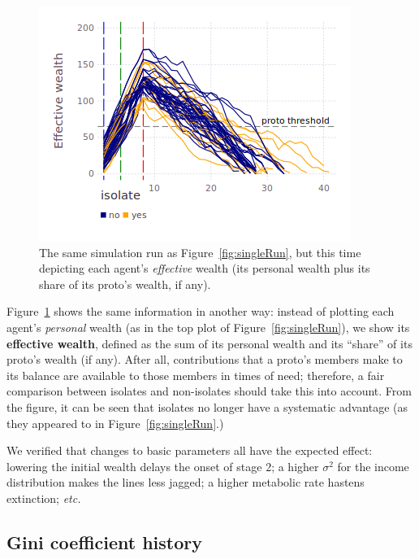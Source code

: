 \begin{figure}[ht]
\centering
\includegraphics[width=\columnwidth]{figures/sampleEffectiveHistory.png}
\caption{The same simulation run as Figure~\ref{fig:singleRun}, but this time
depicting each agent's \textit{effective} wealth (its personal wealth plus its
share of its proto's wealth, if any).}
\label{fig:effectiveWealthSingleRun}
\end{figure}

Figure~\ref{fig:effectiveWealthSingleRun} shows the same information in another
way: instead of plotting each agent's \textit{personal} wealth (as in the top
plot of Figure~\ref{fig:singleRun}), we show its \textbf{effective wealth},
defined as the sum of its personal wealth and its ``share'' of its proto's
wealth (if any). After all, contributions that a proto's members make to its
balance are available to those members in times of need; therefore, a fair
comparison between isolates and non-isolates should take this into account.
From the figure, it can be seen that isolates no longer have a systematic
advantage (as they appeared to in Figure~\ref{fig:singleRun}.)

We verified that changes to basic parameters all have the expected effect:
lowering the initial wealth delays the onset of stage 2; a higher $\sigma^2$
for the income distribution makes the lines less jagged; a higher metabolic
rate hastens extinction; \textit{etc.}

\subsection{Gini coefficient history}

